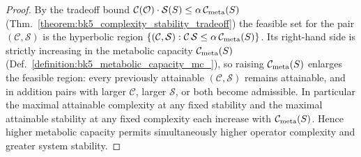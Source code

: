 \begin{proof}
\label{proof:bk5_complexity_stability_tradeoff_cor}
\leavevmode
By the tradeoff bound $\mathcal{C}(\mathcal{O})\cdot\mathcal{S}(S)\le\alpha\,\mathcal{C}_{\text{meta}}(S)$ (Thm.~\ref{theorem:bk5_complexity_stability_tradeoff}) the feasible set for the pair $(\mathcal{C},\mathcal{S})$ is the hyperbolic region $\{(\mathcal{C},\mathcal{S}):\mathcal{C}\,\mathcal{S}\le\alpha\,\mathcal{C}_{\text{meta}}(S)\}$. Its right-hand side is strictly increasing in the metabolic capacity $\mathcal{C}_{\text{meta}}(S)$ (Def.~\ref{definition:bk5_metabolic_capacity_mc_}), so raising $\mathcal{C}_{\text{meta}}(S)$ enlarges the feasible region: every previously attainable $(\mathcal{C},\mathcal{S})$ remains attainable, and in addition pairs with larger $\mathcal{C}$, larger $\mathcal{S}$, or both become admissible. In particular the maximal attainable complexity at any fixed stability and the maximal attainable stability at any fixed complexity each increase with $\mathcal{C}_{\text{meta}}(S)$. Hence higher metabolic capacity permits simultaneously higher operator complexity and greater system stability.
\end{proof}
